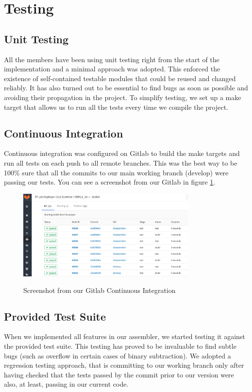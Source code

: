 \documentclass[11pt]{article}
\begin{document}
\section{Testing}
\subsection{Unit Testing}
All the members have been using unit testing right from the start of the implementation and a minimal approach was adopted. This enforced the existence of self-contained testable modules that could be reused and changed reliably. It has also turned out to be essential to find bugs as soon as possible and avoiding their propagation in the project.
To simplify testing, we set up a make target that allows us to run all the tests every time we compile the project. 

\subsection{Continuous Integration}
Continuous integration was configured on Gitlab to build the make targets and run all tests on each push to all remote branches. This was the best way to be 100\% sure that all the commits to our main working branch (develop) were passing our tests. You can see a screenshot from our Gitlab in figure \ref{fig:ContInt}.

\begin{figure}[h]
\caption{Screenshot from our Gitlab Continuous Integration}
\centering
\includegraphics[width=0.8\textwidth]{images/ContInt}
\label{fig:ContInt}
\end{figure}

\subsection{Provided Test Suite}
When we implemented all features in our assembler, we started testing it against the provided test suite. This testing has proved to be invaluable to find subtle bugs (such as overflow in certain cases of binary subtraction). We adopted a regression testing approach, that is committing to our working branch only after having checked that the tests passed by the commit prior to our version were also, at least, passing in our current code.
\end{document}
